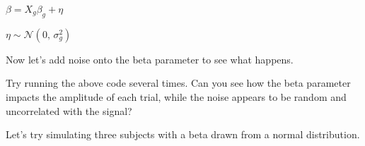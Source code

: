 \documentclass[letterpaper,10pt,english]{sphinxmanual}
\begin{document}
\(\beta = X_g\beta_g + \eta\)

\(\eta \sim \mathcal{N}(0,\,\sigma_g^{2})\)

Now let’s add noise onto the beta parameter to see what happens.

\begin{sphinxVerbatim}[commandchars=\\\{\}]
  
  
  
   
\PYG{p}{[}\PYG{p}{]} \PYG{p}{[}  \PYG{p}{]}
\end{sphinxVerbatim}

\noindent{}

Try running the above code several times. Can you see how the beta parameter impacts the amplitude of each trial, while the noise appears to be random and uncorrelated with the signal?

Let’s try simulating three subjects with a beta drawn from a normal distribution.
\end{document}
